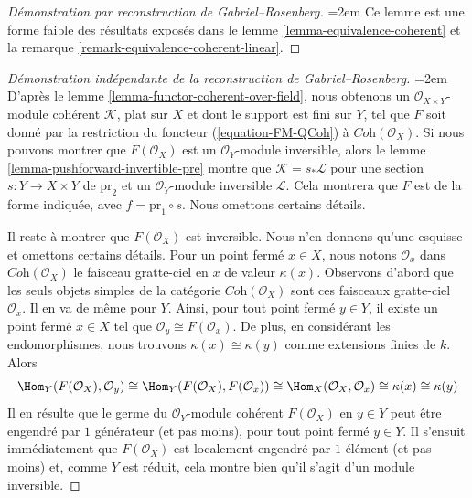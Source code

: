 \begin{proof}[\small{}Démonstration par reconstruction de Gabriel--Rosenberg]
\begingroup\emergencystretch=2em
Ce lemme est une forme faible des résultats exposés dans le
lemme \ref{lemma-equivalence-coherent} et la
remarque \ref{remark-equivalence-coherent-linear}.\par\endgroup
\end{proof}

\begin{proof}[\small{}Démonstration indépendante de la reconstruction de Gabriel--Rosenberg]
\begingroup\emergencystretch=2em
D'après le lemme \ref{lemma-functor-coherent-over-field}, nous obtenons un
$\mathcal{O}_{X \times Y}$-module cohérent $\mathcal{K}$, plat sur $X$ et
dont le support est fini sur $Y$, tel que $F$ soit donné par la restriction
du foncteur (\ref{equation-FM-QCoh}) à $\textit{Coh}(\mathcal{O}_X)$.
Si nous pouvons montrer que $F(\mathcal{O}_X)$ est un
$\mathcal{O}_Y$-module inversible, alors le
lemme \ref{lemma-pushforward-invertible-pre} montre que
$\mathcal{K} = s_*\mathcal{L}$ pour une section
$s : Y \to X \times Y$ de $\text{pr}_2$ et un
$\mathcal{O}_Y$-module inversible $\mathcal{L}$.
Cela montrera que $F$ est de la forme indiquée, avec
$f = \text{pr}_1 \circ s$. Nous omettons certains détails.\par\endgroup

\medskip\noindent
Il reste à montrer que $F(\mathcal{O}_X)$ est inversible. Nous n'en donnons
qu'une esquisse et omettons certains détails.
Pour un point fermé $x \in X$, nous notons $\mathcal{O}_x$ dans
$\textit{Coh}(\mathcal{O}_X)$ le faisceau gratte-ciel en $x$ de valeur
$\kappa(x)$. Observons d'abord que les seuls objets simples de la catégorie
$\textit{Coh}(\mathcal{O}_X)$ sont ces faisceaux gratte-ciel
$\mathcal{O}_x$. Il en va de même pour $Y$. Ainsi, pour tout point fermé
$y \in Y$, il existe un point fermé $x \in X$ tel que
$\mathcal{O}_y \cong F(\mathcal{O}_x)$. De plus, en considérant les
endomorphismes, nous trouvons $\kappa(x) \cong \kappa(y)$ comme extensions
finies de $k$. Alors
$$
\Hom_Y(F(\mathcal{O}_X), \mathcal{O}_y) \cong
\Hom_Y(F(\mathcal{O}_X), F(\mathcal{O}_x)) \cong
\Hom_X(\mathcal{O}_X, \mathcal{O}_x) \cong \kappa(x) \cong \kappa(y)
$$
Il en résulte que le germe du $\mathcal{O}_Y$-module cohérent
$F(\mathcal{O}_X)$ en $y \in Y$ peut être engendré par $1$ générateur (et
pas moins), pour tout point fermé $y \in Y$. Il s'ensuit immédiatement que
$F(\mathcal{O}_X)$ est localement engendré par $1$ élément (et pas moins) et,
comme $Y$ est réduit, cela montre bien qu'il s'agit d'un module inversible.
\end{proof}















